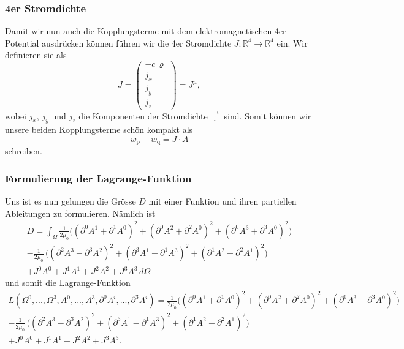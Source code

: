 \subsubsection{4er Stromdichte}
Damit wir nun auch die Kopplungsterme mit dem elektromagnetischen 4er Potential ausdrücken können führen wir die 4er Stromdichte
\(
J:\mathbb{R}^4 \rightarrow \mathbb{R}^4
\)
ein. Wir definieren sie als
\begin{equation}
J
=
\begin{pmatrix}
	-c\,\varrho\\
	j_x\\
	j_y\\
	j_z
\end{pmatrix}
=
J^{\mu},
\end{equation}
wobei $j_x$, $j_y$ und $j_z$ die Komponenten der Stromdichte $\vec{\jmath}$ sind.
Somit können wir unsere beiden Kopplungsterme schön kompakt  als
\begin{equation}
	w_{\text{p}} - w_{\text{q}}
	=
	J\cdot A
\end{equation}
schreiben.

\subsubsection{Formulierung der Lagrange-Funktion}
Uns ist es nun gelungen die Grösse $D$ mit einer Funktion und ihren partiellen Ableitungen zu formulieren. Nämlich ist 
\begin{align*}
D
=
\int_{\Omega}
\frac{1}{2\mu_0}\biggl(\left(\partial^0 A^1 + \partial^1 A^0\right)^2 + \left(\partial^0 A^2 + \partial^2 A^0\right)^2 + 
\left(\partial^0 A^3 + \partial^3 A^0\right)^2\biggr) \\
-  \frac{1}{2\mu_0}\,\biggl(\left(\partial^2 A^3 - \partial^3 A^2\right)^2 + \left(\partial^3 A^1 - \partial^1 A^3\right)^2 + 
\left(\partial^1 A^2 - \partial^2 A^1\right)^2\biggr)\\
+ J^0 A^0 + J^1 A^1 + J^2 A^2 + J^3 A^3 \,d\Omega
\end{align*}
und somit die Lagrange-Funktion
\begin{align*}
L(\Omega^0,...,\Omega^3, A^0,...,A^3, \partial^0 A^i,...,\partial^3 A^i)
=
\frac{1}{2\mu_0}\biggl(\left(\partial^0 A^1 + \partial^1 A^0\right)^2 + \left(\partial^0 A^2 + \partial^2 A^0\right)^2 + 
\left(\partial^0 A^3 + \partial^3 A^0\right)^2\biggr) \\
-  \frac{1}{2\mu_0}\,\biggl(\left(\partial^2 A^3 - \partial^3 A^2\right)^2 + \left(\partial^3 A^1 - \partial^1 A^3\right)^2 + 
\left(\partial^1 A^2 - \partial^2 A^1\right)^2\biggr)\\
+ J^0 A^0 + J^1 A^1 + J^2 A^2 + J^3 A^3.
\end{align*}

